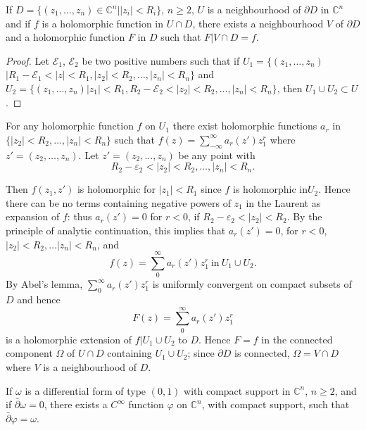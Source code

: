\setcounter{lemma}{0}
\begin{lemma}\label{chap2:sec8:lem1}%
  If $D = \{(z_1, \ldots , z_n) \in \mathbb{C}^n  | |z_i| < R_i \}$,
  $n \geq 2$, $U$ is a neighbourhood of $\partial D$ in $\mathbb{C}^n$
  and if $f$ is a holomorphic function in $U \cap D$, there exists a
  neighbourhood $V$ of $\partial D$ and a holomorphic function $F$ in
  $D$ such that $F | V \cap D = f$. 
\end{lemma}

\begin{proof}
  Let $\mathscr{E}_1$, $\mathscr{E}_2$ be two positive numbers such
  that if $U_1 = \{ (z_1, \ldots , z_n)$ $| R_1 - \mathscr{E}_1 < |z| <
  R_1 , |z_2| < R_2, \ldots , |z_n| < R_n   \}$ and $U_2 = \{ (z_1,
  \ldots , z_n)  |z_1| < R_1 , R_2 - \mathscr{E}_2 <  |z_2| < R_2,
  \ldots , |z_n| < R_n   \}$, then $U_1 \cup U_2 \subset U$. 
\end{proof}

For any holomorphic function $f$ on $U_1$ there exist holomorphic
functions $a_r$ in $\{ |z_2| < R_2, \ldots , |z_n| < R_n \}$ such that
$f(z) = \sum \limits^\infty_{-\infty} a_r(z') z^r_1$ where $z' = (z_2,
\ldots , z_n)$. Let $z' = (z_2, \ldots , z_n)$ be any point with  
$$
R_2 - \varepsilon_2 < |z_2| < R_2 , \ldots , |z_n| < R_n.
$$

Then $f(z_1, z')$ is holomorphic for $|z_1| < R_1$ since $f$ is
holomorphic in\pageoriginale $U_2$. Hence there can be no terms containing negative
powers of $z_1$ in the Laurent as expansion of $f$: thus $a_r (z') = 0
$ for $r < 0$, if $R_2 - \varepsilon_2 < |z_2| < R_2$. By the
principle of analytic continuation, this implies that $a_r(z') = 0$,
for $r < 0$, $|z_2| < R_2, \ldots |z_n| < R_n$, and  
$$
f(z) = \sum^\infty_0 a_r (z') z^r_1 ~\text{in}~ U_1 \cup U_2.
$$
By Abel's lemma, $ \sum\limits^\infty_0 a_r (z') z^r_1$ is uniformly
convergent on compact subsets of $D$ and hence	 
$$
F(z) =  \sum^\infty_0 a_r (z') z^r_1
$$
is a holomorphic extension of $f | U_1 \cup U_2$ to $D$. Hence $F = f$
in the connected component $\Omega$ of $U \cap D$ containing $U_1 \cup
U_2$; since $\partial D$ is connected, $\Omega = V \cap D$where $V$ is
a neighbourhood of $D$. 

\begin{lemma}\label{chap2:sec8:lem2}%
  If $\omega$ is a differential form of type $(0,1)$ with compact
  support in $\mathbb{C}^n$, $n \geq 2$, and if $\bar{\partial} \omega
  = 0$, there exists a $C^\infty$ function $\varphi$ on
  $\mathbb{C}^n$, with compact support, such that $\bar{\partial}
  \varphi = \omega$. 
\end{lemma}

